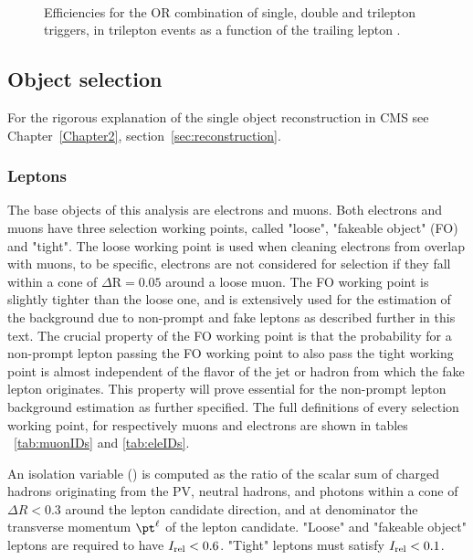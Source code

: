 \begin{figure}[h]
{  }\\
  \caption{Efficiencies for the OR combination of single, double and trilepton triggers, in trilepton events as a function
  of the trailing lepton \pt.}
  \label{fig:3l1l1lEff}
\end{figure}

\vspace{2cm}
\subsection{Object selection}\label{sec:object}
For the rigorous explanation of the single object reconstruction in
CMS see Chapter~\ref{Chapter2}, section~\ref{sec:reconstruction}.

\subsubsection{Leptons}
The base objects of this analysis are electrons and muons. Both electrons and muons have three selection working points, called "loose", "fakeable object" (FO) and "tight". The loose working point is used when cleaning electrons from overlap with muons, to be specific, electrons are not considered for selection if they fall within a cone of $\Delta \mathrm{R} = 0.05$ around a loose muon. The FO working point is slightly tighter than the loose one, and is extensively used for the estimation of the background due to non-prompt and fake leptons as described further in this text. The crucial property of the FO working point is that the probability for a non-prompt lepton passing the FO working point to also pass the tight working point is almost independent of the flavor of the jet or hadron from which the fake lepton originates. This property will prove essential for the non-prompt lepton background estimation as further specified. The full definitions of every selection working point, for respectively muons and electrons are shown in tables ~\ref{tab:muonIDs} and \ref{tab:eleIDs}.

An isolation variable (\Irel) is computed as the ratio of the scalar 
\pt sum of charged hadrons originating from the PV, neutral hadrons, and photons within a cone of 
$\Delta R<0.3$ around the lepton candidate direction, and at denominator
the transverse momentum $\pt^\ell$ of the lepton candidate. 
"Loose" and "fakeable object" leptons are required to have $I_{\mathrm{rel}} < 0.6$. 
"Tight" leptons must satisfy $I_{\mathrm{rel}} < 0.1$.

